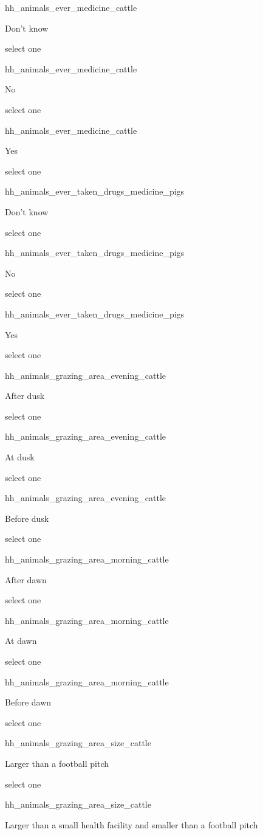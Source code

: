\documentclass[]{article}
\begin{document}
hh\_animals\_ever\_medicine\_cattle

Don't know

select one

hh\_animals\_ever\_medicine\_cattle

No

select one

hh\_animals\_ever\_medicine\_cattle

Yes

select one

hh\_animals\_ever\_taken\_drugs\_medicine\_pigs

Don't know

select one

hh\_animals\_ever\_taken\_drugs\_medicine\_pigs

No

select one

hh\_animals\_ever\_taken\_drugs\_medicine\_pigs

Yes

select one

hh\_animals\_grazing\_area\_evening\_cattle

After dusk

select one

hh\_animals\_grazing\_area\_evening\_cattle

At dusk

select one

hh\_animals\_grazing\_area\_evening\_cattle

Before dusk

select one

hh\_animals\_grazing\_area\_morning\_cattle

After dawn

select one

hh\_animals\_grazing\_area\_morning\_cattle

At dawn

select one

hh\_animals\_grazing\_area\_morning\_cattle

Before dawn

select one

hh\_animals\_grazing\_area\_size\_cattle

Larger than a football pitch

select one

hh\_animals\_grazing\_area\_size\_cattle

Larger than a small health facility and smaller than a football pitch
\end{document}
